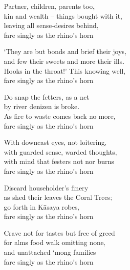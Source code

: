 \begin{MyDescription}{}  	
Partner, children, parents too, \\
kin and wealth – things bought with it,\\
leaving all sense-desires behind,\\
fare singly as the rhino's horn
\end{MyDescription}

\begin{MyDescription}{}  	
`They are but bonds and brief their joys,\\
and few their sweets and more their ills.\\
Hooks in the throat!' This knowing well,\\
fare singly as the rhino's horn
\end{MyDescription}
   
\begin{MyDescription}{}  	
Do snap the fetters, as a net\\
by river denizen is broke.\\
As fire to waste comes back no more,\\
fare singly as the rhino's horn
\end{MyDescription}

\begin{MyDescription}{}  	
With downcast eyes, not loitering,\\
with guarded sense, warded thoughts,\\
with mind that festers not nor burns\\
fare singly as the rhino's horn
\end{MyDescription}
   
\begin{MyDescription}{}  	
Discard householder's finery\\
as shed their leaves the Coral Trees;\\
go forth in K\=asaya robes,\\
fare singly as the rhino's horn
\end{MyDescription}
   
\begin{MyDescription}{}  	
Crave not for tastes but free of greed\\
for alms food walk omitting none,\\
and unattached `mong families\\
fare singly as the rhino's horn
\end{MyDescription}
   
